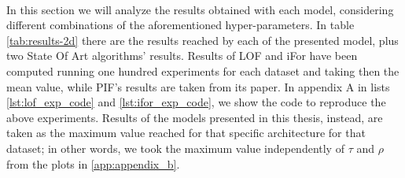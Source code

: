 \paragraph{}
In this section we will analyze the results obtained with each model, considering different combinations of the aforementioned hyper-parameters. \newline
In table \ref{tab:results-2d} there are the results reached by each of the presented model, plus two State Of Art algorithms' results. Results of LOF and iFor have been computed running one hundred experiments for each dataset and taking then the mean value, while PIF's results are taken from its paper. In appendix A in lists \ref{lst:lof_exp_code} and \ref{lst:ifor_exp_code}, we show the code to reproduce the above experiments. \newline
Results of the models presented in this thesis, instead, are taken as the maximum value reached for that specific architecture for that dataset; in other words, we took the maximum value independently of $\tau$ and $\rho$ from the plots in \ref{app:appendix_b}.

